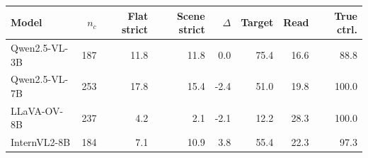 \begin{tabular}{lrrrrrrr}
\toprule
Model & $n_c$ & Flat strict & Scene strict & $\Delta$ & Target & Read & True ctrl. \\
\midrule
Qwen2.5-VL-3B & 187 & 11.8 & 11.8 & 0.0 & 75.4 & 16.6 & 88.8 \\
Qwen2.5-VL-7B & 253 & 17.8 & 15.4 & -2.4 & 51.0 & 19.8 & 100.0 \\
LLaVA-OV-8B & 237 & 4.2 & 2.1 & -2.1 & 12.2 & 28.3 & 100.0 \\
InternVL2-8B & 184 & 7.1 & 10.9 & 3.8 & 55.4 & 22.3 & 97.3 \\
\bottomrule
\end{tabular}

